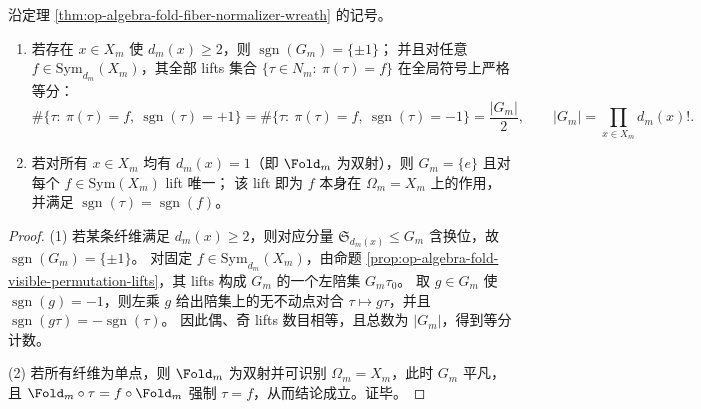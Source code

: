 \begin{corollary}\label{cor:op-algebra-fold-alternating-lift-counting}
沿定理 \ref{thm:op-algebra-fold-fiber-normalizer-wreath} 的记号。
\begin{enumerate}
  \item 若存在 \(x\in X_m\) 使 \(d_m(x)\ge 2\)，则 \(\operatorname{sgn}(G_m)=\{\pm1\}\)；
        并且对任意 \(f\in \mathrm{Sym}_{d_m}(X_m)\)，其全部 lifts 集合
        \(
        \{\tau\in N_m:\ \pi(\tau)=f\}
        \)
        在全局符号上严格等分：
        \[
        \#\{\tau:\ \pi(\tau)=f,\ \operatorname{sgn}(\tau)=+1\}
        =
        \#\{\tau:\ \pi(\tau)=f,\ \operatorname{sgn}(\tau)=-1\}
        =\frac{|G_m|}{2},
        \qquad
        |G_m|=\prod_{x\in X_m}d_m(x)!.
        \]
  \item 若对所有 \(x\in X_m\) 均有 \(d_m(x)=1\)（即 \(\Fold_m\) 为双射），则 \(G_m=\{e\}\) 且对每个 \(f\in\mathrm{Sym}(X_m)\) lift 唯一；
        该 lift 即为 \(f\) 本身在 \(\Omega_m=X_m\) 上的作用，并满足 \(\operatorname{sgn}(\tau)=\operatorname{sgn}(f)\)。
\end{enumerate}
\end{corollary}
\begin{proof}
(1) 若某条纤维满足 \(d_m(x)\ge 2\)，则对应分量 \(\mathfrak S_{d_m(x)}\le G_m\) 含换位，故 \(\operatorname{sgn}(G_m)=\{\pm1\}\)。
对固定 \(f\in \mathrm{Sym}_{d_m}(X_m)\)，由命题 \ref{prop:op-algebra-fold-visible-permutation-lifts}，其 lifts 构成 \(G_m\) 的一个左陪集 \(G_m\tau_0\)。
取 \(g\in G_m\) 使 \(\operatorname{sgn}(g)=-1\)，则左乘 \(g\) 给出陪集上的无不动点对合
\(
\tau\mapsto g\tau
\)，并且 \(\operatorname{sgn}(g\tau)=-\operatorname{sgn}(\tau)\)。
因此偶、奇 lifts 数目相等，且总数为 \(|G_m|\)，得到等分计数。
\par
(2) 若所有纤维为单点，则 \(\Fold_m\) 为双射并可识别 \(\Omega_m=X_m\)，此时 \(G_m\) 平凡，且 \(\Fold_m\circ\tau=f\circ\Fold_m\) 强制 \(\tau=f\)，从而结论成立。证毕。
\end{proof}

\endinput


